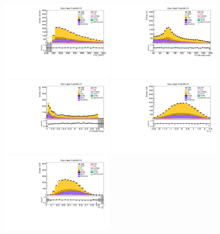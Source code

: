 \begin{figure}[tbp]
  \begin{center}
    \includegraphics[width=0.48\textwidth]{figures/wlnhbb2016/boosted/WenWHTT1bFJCR_fj1Pt.pdf}
    \includegraphics[width=0.48\textwidth]{figures/wlnhbb2016/boosted/WenWHTT1bFJCR_fj1MSD_corr.pdf}
    \includegraphics[width=0.48\textwidth]{figures/wlnhbb2016/boosted/WenWHTT1bFJCR_fj1DoubleCSV.pdf}
    \includegraphics[width=0.48\textwidth]{figures/wlnhbb2016/boosted/WenWHTT1bFJCR_fj1Eta.pdf}
    \includegraphics[width=0.48\textwidth]{figures/wlnhbb2016/boosted/WenWHTT1bFJCR_fj1Tau21SD.pdf}

\end{center}
\end{figure}
